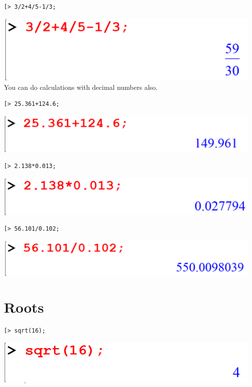 \documentclass[
]{book}
\theoremstyle{definition}
\theoremstyle{definition}
\theoremstyle{definition}
\theoremstyle{definition}
\theoremstyle{remark}
\begin{document}
\begin{verbatim}
[> 3/2+4/5-1/3;
\end{verbatim}

\includegraphics{figures/Lesson 1/fig23.png}
You can do calculations with decimal numbers also.

\begin{verbatim}
[> 25.361+124.6;
\end{verbatim}

\includegraphics{figures/Lesson 1/fig24.png}

\begin{verbatim}
[> 2.138*0.013;
\end{verbatim}

\includegraphics{figures/Lesson 1/fig25.png}

\begin{verbatim}
[> 56.101/0.102;
\end{verbatim}

\includegraphics{figures/Lesson 1/fig26.png}

\section{Roots}\label{roots-1}

\begin{verbatim}
[> sqrt(16);
\end{verbatim}

\includegraphics{figures/Lesson 1/fig27.png}
\end{document}
